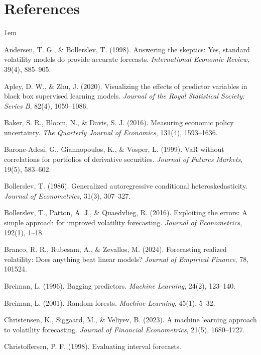 \documentclass[twocolumn,9pt]{extarticle}
\begin{document}
\onecolumn
\section*{References}
\small
\setlength{\parskip}{1pt}

\begingroup
\setlength{\parindent}{-1em}\leftskip1em\relax

Andersen, T. G., \& Bollerslev, T. (1998). Answering the skeptics:
Yes, standard volatility models do provide accurate forecasts.
\textit{International Economic Review}, 39(4), 885--905.\par
Apley, D. W., \& Zhu, J. (2020). Visualizing the effects of
predictor variables in black box supervised learning models.
\textit{Journal of the Royal Statistical Society: Series B}, 82(4),
1059--1086.\par
Baker, S. R., Bloom, N., \& Davis, S. J. (2016). Measuring economic
policy uncertainty. \textit{The Quarterly Journal of Economics},
131(4), 1593--1636.\par
Barone-Adesi, G., Giannopoulos, K., \& Vosper, L. (1999). VaR
without correlations for portfolios of derivative securities.
\textit{Journal of Futures Markets}, 19(5), 583--602.\par
Bollerslev, T. (1986). Generalized autoregressive conditional
heteroskedasticity. \textit{Journal of Econometrics}, 31(3),
307--327.\par
Bollerslev, T., Patton, A. J., \& Quaedvlieg, R. (2016). Exploiting
the errors: A simple approach for improved volatility forecasting.
\textit{Journal of Econometrics}, 192(1), 1--18.\par
Branco, R. R., Rubesam, A., \& Zevallos, M. (2024). Forecasting
realized volatility: Does anything beat linear models?
\textit{Journal of Empirical Finance}, 78, 101524.\par
Breiman, L. (1996). Bagging predictors. \textit{Machine Learning},
24(2), 123--140.\par
Breiman, L. (2001). Random forests. \textit{Machine Learning},
45(1), 5--32.\par
Christensen, K., Siggaard, M., \& Veliyev, B. (2023). A machine
learning approach to volatility forecasting. \textit{Journal of
Financial Econometrics}, 21(5), 1680--1727.\par
Christoffersen, P. F. (1998). Evaluating interval forecasts.
\end{document}
